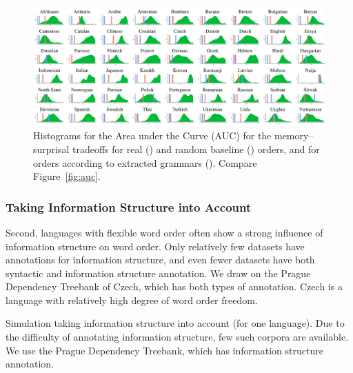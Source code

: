 \begin{figure}
	\begin{center}
\includegraphics[width=\textwidth]{auc-table_MLE.pdf}
\end{center}
\caption{Histograms for the Area under the Curve (AUC) for the memory--surprisal tradeoffs for real () and random baseline () orders, and for orders according to extracted grammars ().
Compare Figure~\ref{fig:auc}. 
}\label{fig:auc-mle}
\end{figure}






\subsubsection{Taking Information Structure into Account}\label{sec:czech}

Second, languages with flexible word order often show a strong influence of information structure on word order.
Only relatively few datasets have annotations for information structure, and even fewer datasets have both syntactic and information structure annotation.
We draw on the Prague Dependency Treebank of Czech, which has both types of annotation.
Czech is a language with relatively high degree of word order freedom.

Simulation taking information structure into account (for one language).
Due to the difficulty of annotating information structure, few such corpora are available.
We use the Prague Dependency Treebank, which has information structure annotation.

